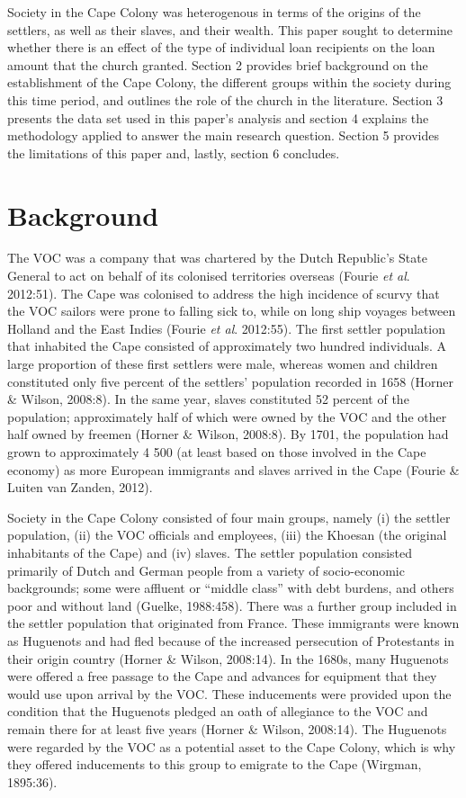 \documentclass[11pt,preprint, authoryear]{elsarticle}
\numberwithin{equation}{section}
\numberwithin{figure}{section}
\numberwithin{table}{section}
\begin{document}
Society in the Cape Colony was heterogenous in terms of the origins of
the settlers, as well as their slaves, and their wealth. This paper
sought to determine whether there is an effect of the type of individual
loan recipients on the loan amount that the church granted. Section 2
provides brief background on the establishment of the Cape Colony, the
different groups within the society during this time period, and
outlines the role of the church in the literature. Section 3 presents
the data set used in this paper's analysis and section 4 explains the
methodology applied to answer the main research question. Section 5
provides the limitations of this paper and, lastly, section 6 concludes.

\hypertarget{background}{%
\section{\texorpdfstring{Background
\label{Literature}}{Background }}\label{background}}

The VOC was a company that was chartered by the Dutch Republic's State
General to act on behalf of its colonised territories overseas (Fourie
\emph{et al}. 2012:51). The Cape was colonised to address the high
incidence of scurvy that the VOC sailors were prone to falling sick to,
while on long ship voyages between Holland and the East Indies (Fourie
\emph{et al}. 2012:55). The first settler population that inhabited the
Cape consisted of approximately two hundred individuals. A large
proportion of these first settlers were male, whereas women and children
constituted only five percent of the settlers' population recorded in
1658 (Horner \& Wilson, 2008:8). In the same year, slaves constituted 52
percent of the population; approximately half of which were owned by the
VOC and the other half owned by freemen (Horner \& Wilson, 2008:8). By
1701, the population had grown to approximately 4 500 (at least based on
those involved in the Cape economy) as more European immigrants and
slaves arrived in the Cape (Fourie \& Luiten van Zanden, 2012).

Society in the Cape Colony consisted of four main groups, namely (i) the
settler population, (ii) the VOC officials and employees, (iii) the
Khoesan (the original inhabitants of the Cape) and (iv) slaves. The
settler population consisted primarily of Dutch and German people from a
variety of socio-economic backgrounds; some were affluent or ``middle
class'' with debt burdens, and others poor and without land (Guelke,
1988:458). There was a further group included in the settler population
that originated from France. These immigrants were known as Huguenots
and had fled because of the increased persecution of Protestants in
their origin country (Horner \& Wilson, 2008:14). In the 1680s, many
Huguenots were offered a free passage to the Cape and advances for
equipment that they would use upon arrival by the VOC. These inducements
were provided upon the condition that the Huguenots pledged an oath of
allegiance to the VOC and remain there for at least five years (Horner
\& Wilson, 2008:14). The Huguenots were regarded by the VOC as a
potential asset to the Cape Colony, which is why they offered
inducements to this group to emigrate to the Cape (Wirgman, 1895:36).
\end{document}
